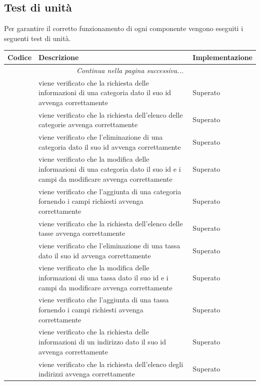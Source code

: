 \subsection{Test di unità} \label{_testUnita}
Per garantire il corretto funzionamento di ogni componente vengono eseguiti i seguenti test di unità.
\begin{center}
	\begin{longtable}{|p{1cm}|p{11cm}|p{3cm}|}
		\hline
		\rowcolor{lighter-grayer}
		\textbf{Codice} & \textbf{Descrizione} & \textbf{Implementazione} \\
		\hline
		\endfirsthead
		\hline
		\multicolumn{3}{|c|}{\textit{Continua nella pagina successiva...}} \\
		\hline
		\endfoot
		\endlastfoot

		\hline
		 & viene verificato che la richiesta delle informazioni di una categoria dato il suo id avvenga correttamente & Superato \\
		 & viene verificato che la richiesta dell'elenco delle categorie avvenga correttamente & Superato \\
		 & viene verificato che l'eliminazione di una categoria dato il suo id avvenga correttamente & Superato \\
		 & viene verificato che la modifica delle informazioni di una categoria dato il suo id e i campi da modificare avvenga correttamente & Superato \\
		 & viene verificato che l'aggiunta di una categoria fornendo i campi richiesti avvenga correttamente & Superato \\
		 & viene verificato che la richiesta dell'elenco delle tasse avvenga correttamente & Superato \\
		 & viene verificato che l'eliminazione di una tassa dato il suo id avvenga correttamente & Superato \\
		 & viene verificato che la modifica delle informazioni di una tassa dato il suo id e i campi da modificare avvenga correttamente & Superato \\
		 & viene verificato che l'aggiunta di una tassa fornendo i campi richiesti avvenga correttamente & Superato \\
		 & viene verificato che la richiesta delle informazioni di un indirizzo dato il suo id avvenga correttamente & Superato \\
		 & viene verificato che la richiesta dell'elenco degli indirizzi avvenga correttamente & Superato \\

\end{longtable}
\end{center}

